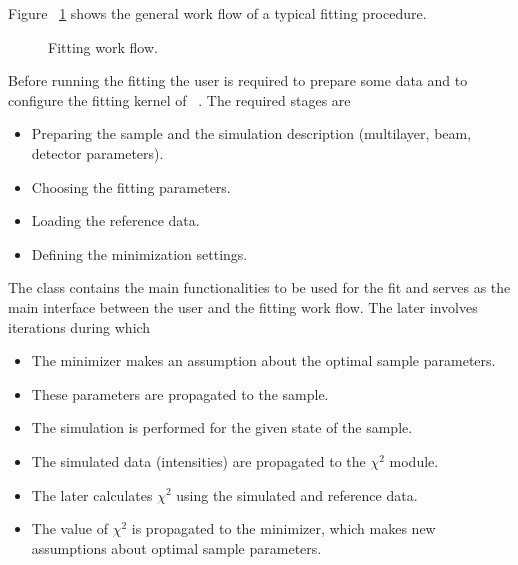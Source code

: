 Figure ~\ref{fig:minimization_workflow} shows the general work flow of a typical fitting procedure.
\begin{figure}[htbp]
\centering
\caption{
Fitting work flow.
}
\label{fig:minimization_workflow}
\end{figure}

Before running the fitting the user is required to prepare some  data and to
configure the fitting kernel of \BornAgain\ . The required stages are

\begin{itemize}
\item Preparing the sample and the simulation description (multilayer, beam, detector parameters).
\item Choosing the fitting parameters.
\item Loading the reference data.
\item Defining the minimization settings.
\end{itemize}

The class  contains the main functionalities to be used for the fit
and serves as the main interface between the user and the fitting work flow.
The later involves iterations during which

\begin{itemize}
\item The minimizer makes an assumption about the optimal sample parameters.
\item These parameters are propagated to the sample.
\item The simulation is performed for the given state of the sample.
\item The simulated data (intensities) are propagated to the $\chi^2$ module.
\item The later calculates $\chi^2$ using the simulated and reference data.
\item The value of $\chi^2$ is propagated to the minimizer, which makes new assumptions about optimal sample parameters.
\end{itemize}

